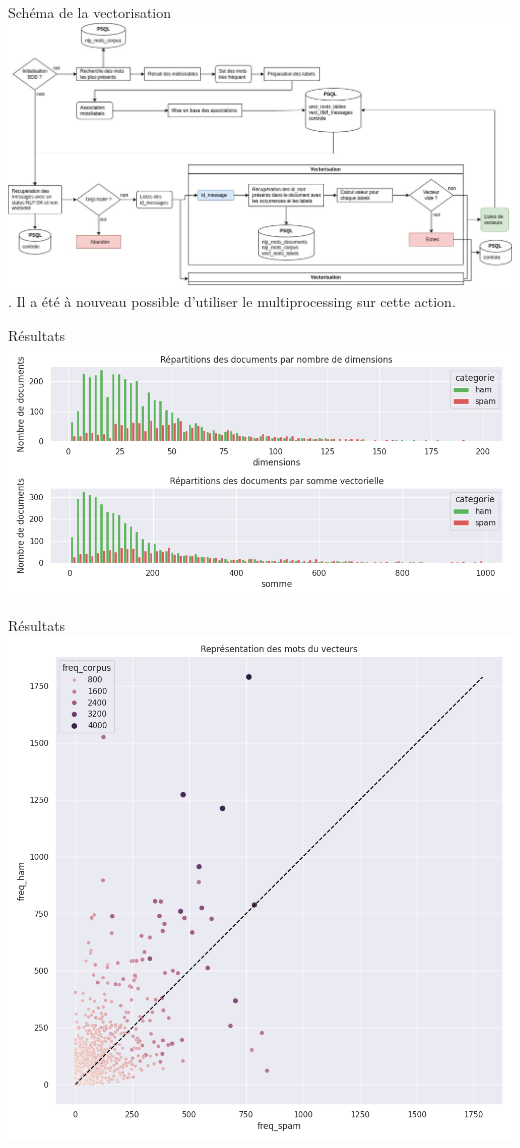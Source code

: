 \documentclass[xelatex,11pt, xcolor=dvipsnames]{beamer}
\begin{document}
\begin{frame}{Schéma de la vectorisation}
	\includegraphics[width=\linewidth]{img/tfidf}.
	Il a été à nouveau possible d'utiliser le multiprocessing sur cette action.
\end{frame}

\begin{frame}{Résultats}
	\includegraphics[width=\linewidth]{img/vectdash}
\end{frame}

\begin{frame}{Résultats}
	\centering
	\includegraphics[scale=0.3]{img/vectmots}
\end{frame}
\end{document}
